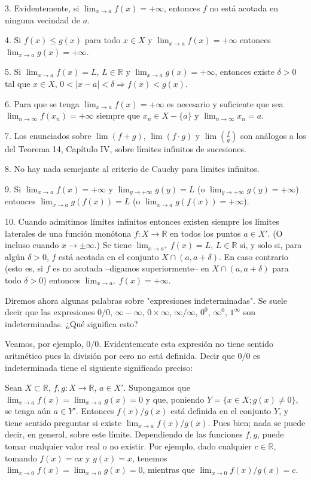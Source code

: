 \documentclass[12pt,oneside]{book}
\begin{document}
3. Evidentemente, si \(\lim_{x \to a} f(x) = +\infty\), entonces \(f\) no está acotada en ninguna vecindad de \(a\).

4. Si \(f(x) \leq g(x)\) para todo \(x \in X\) y \(\lim_{x \to a} f(x) = +\infty\) entonces \(\lim_{x \to a} g(x) = +\infty\).

5. Si \(\lim_{x \to a} f(x) = L\), \(L \in \mathbb{R}\) y \(\lim_{x \to a} g(x) = +\infty\), entonces existe \(\delta > 0\) tal que \(x \in X\), \(0 < |x - a| < \delta \Rightarrow f(x) < g(x)\).

6. Para que se tenga \(\lim_{x \to a} f(x) = +\infty\) es necesario y suficiente que sea \(\lim_{n \to \infty} f(x_n) = +\infty\) siempre que \(x_n \in X - \{a\}\) y \(\lim_{n \to \infty} x_n = a\).

7. Los enunciados sobre \(\lim(f + g)\), \(\lim(f \cdot g)\) y \(\lim\left(\frac{f}{g}\right)\) son análogos a los del Teorema 14, Capítulo IV, sobre límites infinitos de sucesiones.

8. No hay nada semejante al criterio de Cauchy para límites infinitos.

9. Si \(\lim_{x \to a} f(x) = +\infty\) y \(\lim_{y \to +\infty} g(y) = L\) (o \(\lim_{y \to +\infty} g(y) = +\infty\)) entonces \(\lim_{x \to a} g(f(x)) = L\) (o \(\lim_{x \to a} g(f(x)) = +\infty\)).

10. Cuando admitimos límites infinitos entonces existen siempre los límites laterales de una función monótona \( f: X \to \mathbb{R} \) en todos los puntos \( a \in X' \). (O incluso cuando \( x \to \pm\infty \).) Se tiene \( \lim_{x \to a^+} f(x) = L \), \( L \in \mathbb{R} \) si, y solo si, para algún \( \delta > 0 \), \( f \) está acotada en el conjunto \( X \cap (a, a + \delta) \). En caso contrario (esto es, si \( f \) es no acotada –digamos superiormente– en \( X \cap (a, a + \delta) \) para todo \( \delta > 0 \)) entonces \( \lim_{x \to a^+} f(x) = +\infty \).

Diremos ahora algunas palabras sobre "expresiones indeterminadas". Se suele decir que las expresiones \( 0/0 \), \( \infty - \infty \), \( 0 \times \infty \), \( \infty/\infty \), \( 0^0 \), \( \infty^0 \), \( 1^\infty \) son indeterminadas. ¿Qué significa esto?

Veamos, por ejemplo, \( 0/0 \). Evidentemente esta expresión no tiene sentido aritmético pues la división por cero no está definida. Decir que \( 0/0 \) es indeterminada tiene el siguiente significado preciso:

Sean \( X \subset \mathbb{R} \), \( f, g: X \to \mathbb{R} \), \( a \in X' \). Supongamos que \( \lim_{x \to a} f(x) = \lim_{x \to a} g(x) = 0 \) y que, poniendo \( Y = \{x \in X; g(x) \neq 0\} \), se tenga aún \( a \in Y' \). Entonces \( f(x)/g(x) \) está definida en el conjunto \( Y \), y tiene sentido preguntar si existe \( \lim_{x \to a} f(x)/g(x) \). Pues bien; nada se puede decir, en general, sobre este límite. Dependiendo de las funciones \( f, g \), puede tomar cualquier valor real o no existir. Por ejemplo, dado cualquier \( c \in \mathbb{R} \), tomando \( f(x) = cx \) y \( g(x) = x \), tenemos \( \lim_{x \to 0} f(x) = \lim_{x \to 0} g(x) = 0 \), mientras que \( \lim_{x \to 0} f(x)/g(x) = c \).
\end{document}
